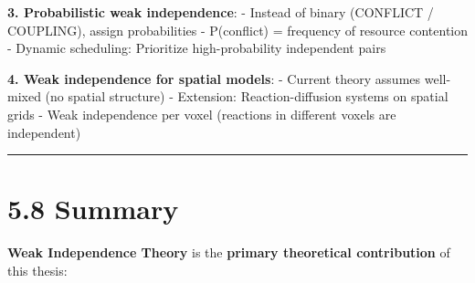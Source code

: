 \textbf{3. Probabilistic weak independence}: - Instead of binary
(CONFLICT / COUPLING), assign probabilities - P(conflict) = frequency of
resource contention - Dynamic scheduling: Prioritize high-probability
independent pairs

\textbf{4. Weak independence for spatial models}: - Current theory
assumes well-mixed (no spatial structure) - Extension:
Reaction-diffusion systems on spatial grids - Weak independence per
voxel (reactions in different voxels are independent)

\begin{center}\rule{0.5\linewidth}{0.5pt}\end{center}

\hypertarget{summary}{%
\section{5.8 Summary}\label{summary}}

\textbf{Weak Independence Theory} is the \textbf{primary theoretical
contribution} of this thesis:

